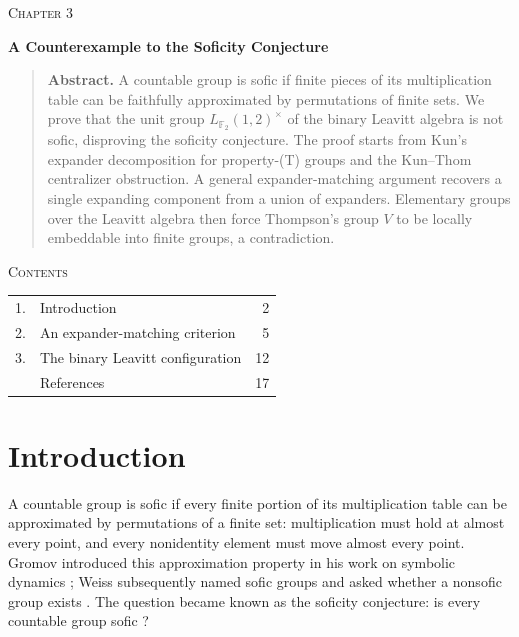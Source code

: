 \documentclass[10pt]{article}
\newcommand{\F}{\mathbb{F}}
\begin{document}
\setcounter{page}{77}

\begin{center}
{\scshape Chapter 3\par}
\vspace{1.4em}
{\Large\bfseries A Counterexample to the Soficity Conjecture\par}
\end{center}

\vspace{1.2em}
\begin{quote}
\small
\textbf{Abstract.} A countable group is sofic if finite pieces of its multiplication table can be faithfully approximated by permutations of finite sets. We prove that the unit group $L_{\F_2}(1,2)^\times$ of the binary Leavitt algebra is not sofic, disproving the soficity conjecture. The proof starts from Kun's expander decomposition for property-(T) groups and the Kun--Thom centralizer obstruction. A general expander-matching argument recovers a single expanding component from a union of expanders. Elementary groups over the Leavitt algebra then force Thompson's group $V$ to be locally embeddable into finite groups, a contradiction.
\end{quote}

\vspace{1.8em}
\begin{center}
\textsc{Contents}
\end{center}
\noindent
\begin{tabular*}{\textwidth}{@{\extracolsep{\fill}}llr}
1. & Introduction & 2\\
2. & An expander-matching criterion & 5\\
3. & The binary Leavitt configuration & 12\\
& References & 17
\end{tabular*}

\newpage
\section{Introduction}

A countable group is sofic if every finite portion of its multiplication table can be approximated by permutations of a finite set: multiplication must hold at almost every point, and every nonidentity element must move almost every point. Gromov introduced this approximation property in his work on symbolic dynamics \cite{Gro99}; Weiss subsequently named sofic groups and asked whether a nonsofic group exists \cite[p.~351]{Wei00}. The question became known as the soficity conjecture: is every countable group sofic \cite[Open Question~3.8]{Pes08}?
\end{document}
